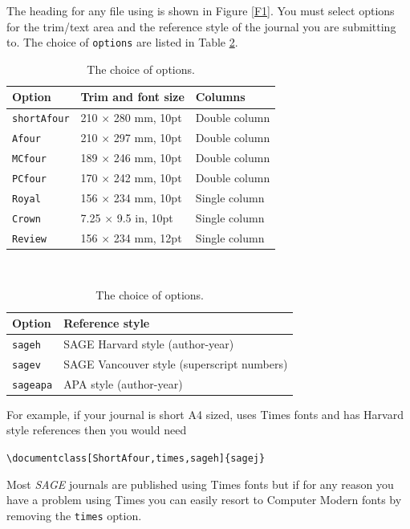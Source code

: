 \documentclass[Afour,sageh,times]{includes/tex/sagej}
\begin{document}
The heading for any file using \textsf{\journalclass} is shown in Figure
\ref{F1}. You must select options for the trim/text area and the
reference style of the journal you are submitting to. The choice of
\verb+options+ are listed in Table \ref{T1}.

\begin{table}[h]
  \small\sf\centering
  \caption{The choice of options.\label{T1}}
  \begin{tabular}{lll}
  \toprule
  Option              & Trim and font size         & Columns       \\
  \midrule
  \texttt{shortAfour} & 210 $\times$ 280 mm, 10pt  & Double column \\
  \texttt{Afour}      & 210 $\times$ 297 mm, 10pt  & Double column \\
  \texttt{MCfour}     & 189 $\times$ 246 mm, 10pt  & Double column \\
  \texttt{PCfour}     & 170 $\times$ 242 mm, 10pt  & Double column \\
  \texttt{Royal}      & 156 $\times$ 234 mm, 10pt  & Single column \\
  \texttt{Crown}      & 7.25 $\times$ 9.5 in, 10pt & Single column \\
  \texttt{Review}     & 156 $\times$ 234 mm, 12pt  & Single column \\
  \bottomrule
  \end{tabular}\\[10pt]
  \begin{tabular}{ll}
  \toprule
  Option&Reference style\\
  \midrule
  \texttt{sageh}&SAGE Harvard style (author-year)\\
  \texttt{sagev}&SAGE Vancouver style (superscript numbers)\\
  \texttt{sageapa}&APA style (author-year)\\
  \bottomrule
  \end{tabular}
\end{table}

For example, if your journal is short A4 sized, uses Times fonts and has
Harvard style references then you would need

\begin{small}
\noindent \verb+\documentclass[ShortAfour,times,sageh]{sagej}+
\end{small}

Most \textit{SAGE} journals are published using Times fonts but if for
any reason you have a problem using Times you can easily resort to
Computer Modern fonts by removing the \verb"times" option.
\end{document}
